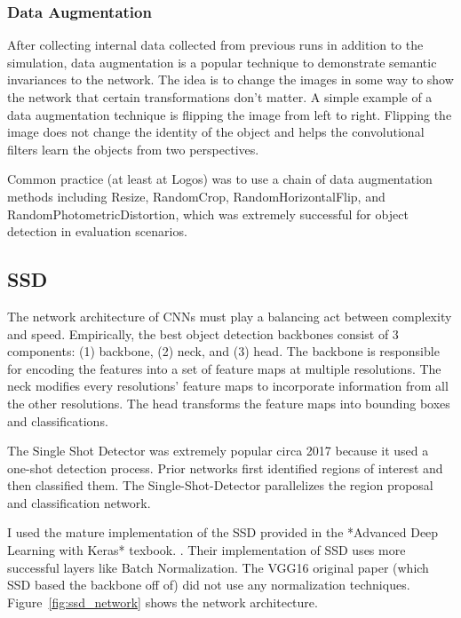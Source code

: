 \documentclass[12pt]{article}
\begin{document}
\subsubsection{Data Augmentation}
After collecting internal data collected from previous runs in addition to the simulation, data augmentation is a popular technique to demonstrate semantic invariances to the network. \cite{krizhevskyImageNetClassificationDeep2012} The idea is to change the images in some way to show the network that certain transformations don't matter. A simple example of a data augmentation technique is flipping the image from left to right. Flipping the image does not change the identity of the object and helps the convolutional filters learn the objects from two perspectives.

Common practice (at least at Logos) was to use a chain of data augmentation methods including Resize, RandomCrop, RandomHorizontalFlip, and RandomPhotometricDistortion, which was extremely successful for object detection in evaluation scenarios.

\subsection{SSD}
The network architecture of CNNs must play a balancing act between complexity and speed. Empirically, the best object detection backbones consist of 3 components: (1) backbone, (2) neck, and (3) head.
The backbone is responsible for encoding the features into a set of feature maps at multiple resolutions. The neck modifies every resolutions' feature maps to incorporate information from all the other resolutions. \cite{linFeaturePyramidNetworks2017} The head transforms the feature maps into bounding boxes and classifications.

The Single Shot Detector was extremely popular circa 2017 because it used a one-shot detection process. \cite{liuSSDSingleShot2016} Prior networks first identified regions of interest and then classified them. The Single-Shot-Detector parallelizes the region proposal and classification network. 

I used the mature implementation of the SSD provided in the *Advanced Deep Learning with Keras* texbook. \cite{atienzaAdvancedDeepLearning2020}. Their implementation of SSD uses more successful layers like Batch Normalization. \cite{ioffeBatchNormalizationAccelerating2015}  The VGG16 original paper (which SSD based the backbone off of) did not use any normalization techniques. \cite{simonyanVeryDeepConvolutional2015} Figure~\ref{fig:ssd_network} shows the network architecture.
\end{document}
